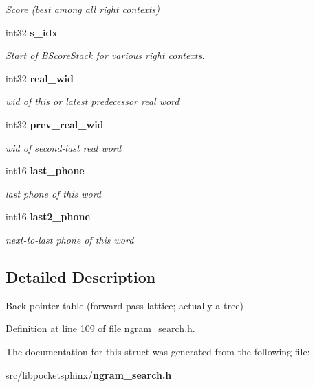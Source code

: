 \begin{DoxyCompactItemize}
\begin{DoxyCompactList}\small\item\em Score (best among all right contexts) \end{DoxyCompactList}\item 
int32 {\bf s\+\_\+idx}\label{structbptbl__s_abf9e4bcf1927aa09fb2b30c59e99f551}

\begin{DoxyCompactList}\small\item\em Start of B\+Score\+Stack for various right contexts. \end{DoxyCompactList}\item 
int32 {\bf real\+\_\+wid}\label{structbptbl__s_a91247e4f807cf780afe8f5ac45e720b8}

\begin{DoxyCompactList}\small\item\em wid of this or latest predecessor real word \end{DoxyCompactList}\item 
int32 {\bf prev\+\_\+real\+\_\+wid}\label{structbptbl__s_a83784e3b0121bc365d485151ab277920}

\begin{DoxyCompactList}\small\item\em wid of second-\/last real word \end{DoxyCompactList}\item 
int16 {\bf last\+\_\+phone}\label{structbptbl__s_aa7704ba76d3dcde6b8a24855362a4289}

\begin{DoxyCompactList}\small\item\em last phone of this word \end{DoxyCompactList}\item 
int16 {\bf last2\+\_\+phone}\label{structbptbl__s_a27b8e54bb7552e6afc15e4f44f42e3b7}

\begin{DoxyCompactList}\small\item\em next-\/to-\/last phone of this word \end{DoxyCompactList}\end{DoxyCompactItemize}


\subsection{Detailed Description}
Back pointer table (forward pass lattice; actually a tree) 

Definition at line 109 of file ngram\+\_\+search.\+h.



The documentation for this struct was generated from the following file\+:\begin{DoxyCompactItemize}
\item 
src/libpocketsphinx/{\bf ngram\+\_\+search.\+h}\end{DoxyCompactItemize}
